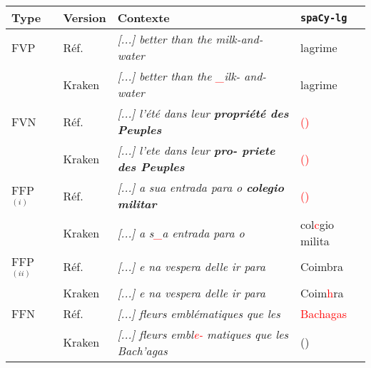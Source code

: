 
\scriptsize{
\begin{tabular}{|l|l|l|l|}
\hline
Type &Version & Contexte & \texttt{spaCy-lg} \\
\hline
\hline
FVP&Réf. &\textit{[...] better than the milk-and-water}& lagrime\\
&Kraken &\textit{[...] better than the \textcolor{red}{\_}ilk-
and-water}& lagrime \\
\hline
FVN&Réf. & \textit{[...] l'été dans leur \textbf{propriété des Peuples}}& \textcolor{red}{()} \\
&Kraken &\textit{[...] l'ete dans leur \textbf{pro-
priete des Peuples}}& \textcolor{red}{()} \\
\hline
\hline
FFP $^{(i)}$&Réf. &\textit{[...] a sua entrada para o \textbf{colegio militar}}& \textcolor{red}{()} \\
&Kraken &\textit{[...] a s\textcolor{red}{\_}a entrada para
o }& col\textcolor{red}{c}gio milita \\
FFP $^{(ii)}$&Réf. & \textit{[...] e na vespera delle ir para}
&Coimbra \\
&Kraken & \textit{[...] e na vespera delle ir para} &Coim\textcolor{red}{h}ra \\
\hline
FFN&Réf. & \textit{[...] fleurs emblématiques que les }& \textcolor{red}{Bachagas} \\
&Kraken & \textit{[...] fleurs embl\textcolor{red}{e-}
matiques que les Bach'agas}& () \\
\hline
\end{tabular}}


